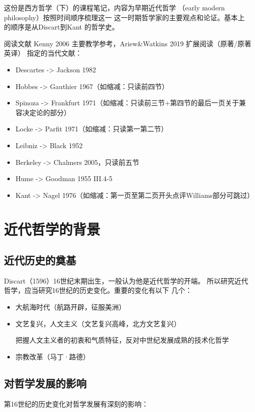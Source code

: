 \documentclass{ctexart}
\begin{document}
这份是西方哲学（下）的课程笔记，内容为早期近代哲学
（early modern philosophy）按照时间顺序梳理这一
这一时期哲学家的主要观点和论证。基本上的顺序是从Discart到Kant
的哲学史。

\begin{fancybox}{阅读文献}
Kenny 2006 主要教学参考，Ariew\&Watkins 2019 扩展阅读（原著/原著英译）
指定的当代文献：
\begin{itemize}
    \item Descartes -> Jackson 1982
    \item Hobbes -> Gauthier 1967（如缩减：只读前四节）
    \item Spinoza -> Frankfurt 1971（如缩减：只读前三节+第四节的最后一页关于兼容决定论的部分）
    \item Locke -> Parfit 1971（如缩减：只读第一第二节）
    \item Leibniz -> Black 1952
    \item Berkeley -> Chalmers 2005，只读前五节
    \item Hume -> Goodman 1955 III.4-5
    \item Kant -> Nagel 1976（如缩减：第一页至第二页开头点评Williams部分可跳过）
\end{itemize}
\end{fancybox}

\section{近代哲学的背景}

\subsection{近代历史的奠基}
Discart（1596）16世纪末期出生，一般认为他是近代哲学的开端。
所以研究近代哲学，应当研究16世纪的历史变化。重要的变化有以下
几个：

\begin{itemize}
    \item 大航海时代（航路开辟，征服美洲）
    \item 文艺复兴，人文主义（文艺复兴高峰，北方文艺复兴）
    
    把握人文主义者的初衷和气质特征，反对中世纪发展成熟的技术化哲学
    \item 宗教改革（马丁·路德）
\end{itemize}

\subsection{对哲学发展的影响}
第16世纪的历史变化对哲学发展有深刻的影响：
\end{document}
